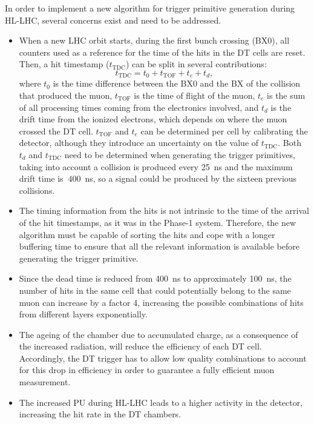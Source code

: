 \documentclass[../main.tex]{subfiles}
\begin{document}
In order to implement a new algorithm for trigger primitive generation during HL-LHC, several concerns exist and need to be addressed.
\begin{itemize}
	\item When a new LHC orbit starts, during the first bunch crossing (BX0), all counters used as a reference for the time of the hits in the DT cells are reset. Then, a hit timestamp ($t_{\text{TDC}}$) can be split in several contributions:
	\begin{equation}
		t_{\text{TDC}} = t_0 + t_{\text{TOF}} + t_e + t_d,
	\end{equation}
	where $t_0$ is the time difference between the BX0 and the BX of the collision that produced the muon, $t_{\text{TOF}}$ is the time of flight of the muon, $t_e$ is the sum of all processing times coming from the electronics involved, and $t_d$ is the drift time from the ionized electrons, which depends on where the muon crossed the DT cell. $t_{\text{TOF}}$ and $t_e$ can be determined per cell by calibrating the detector, although they introduce an uncertainty on the value of $t_{\text{TDC}}$. Both $t_d$ and $t_{\text{TDC}}$ need to be determined when generating the trigger primitives, taking into account a collision is produced every 25~ns and the maximum drift time is $~400$~ns, so a signal could be produced by the sixteen previous collisions.
	\item The timing information from the hits is not intrinsic to the time of the arrival of the hit timestamps, as it was in the Phase-1 system. Therefore, the new algorithm must be capable of sorting the hits and cope with a longer buffering time to ensure that all the relevant information is available before generating the trigger primitive.
	\item Since the dead time is reduced from 400~ns to approximately 100~ns, the number of hits in the same cell that could potentially belong to the same muon can increase by a factor 4, increasing the possible combinations of hits from different layers exponentially.
	\item The ageing of the chamber due to accumulated charge, as a consequence of the increased radiation, will reduce the efficiency of each DT cell. Accordingly, the DT trigger has to allow low quality combinations to account for this drop in efficiency in order to guarantee a fully efficient muon measurement.
	\item The increased PU during HL-LHC leads to a higher activity in the detector, increasing the hit rate in the DT chambers.
\end{itemize}
\end{document}
